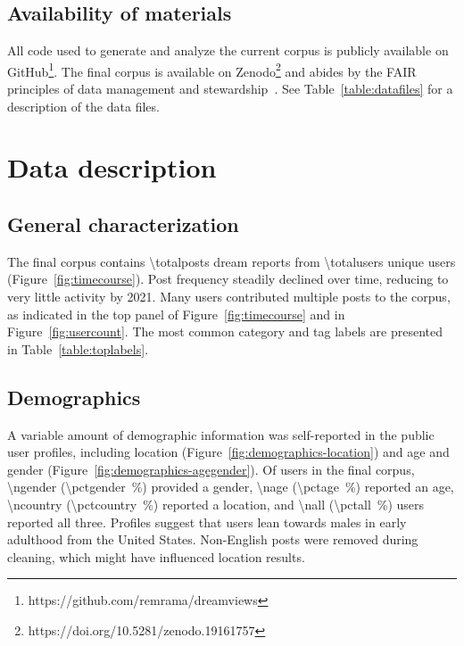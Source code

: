 \documentclass[10pt,a4paper,twocolumn]{article}
\begin{document}
\subsection{Availability of materials}\label{sec:availability}

All code used to generate and analyze the current corpus is publicly available on GitHub\footnote{https://github.com/remrama/dreamviews}. The final corpus is available on Zenodo\footnote{https://doi.org/10.5281/zenodo.19161757} and abides by the FAIR principles of data management and stewardship~\cite{wilkinson2016}. See Table~\ref{table:datafiles} for a description of the data files.

\section{Data description}\label{sec:description}

\subsection{General characterization}\label{sec:general-characterization}

The final corpus contains \num{\totalposts} dream reports from \num{\totalusers} unique users (Figure~\ref{fig:timecourse}). Post frequency steadily declined over time, reducing to very little activity by 2021. Many users contributed multiple posts to the corpus, as indicated in the top panel of Figure~\ref{fig:timecourse} and in Figure~\ref{fig:usercount}. The most common category and tag labels are presented in Table~\ref{table:toplabels}.

\subsection{Demographics}\label{sec:demographics}

A variable amount of demographic information was self-reported in the public user profiles, including location (Figure~\ref{fig:demographics-location}) and age and gender (Figure~\ref{fig:demographics-agegender}). Of users in the final corpus, \num{\ngender} (\qty{\pctgender}{\percent}) provided a gender, \num{\nage} (\qty{\pctage}{\percent}) reported an age, \num{\ncountry} (\qty{\pctcountry}{\percent}) reported a location, and \num{\nall} (\qty{\pctall}{\percent}) users reported all three. Profiles suggest that users lean towards males in early adulthood from the United States. Non-English posts were removed during cleaning, which might have influenced location results.
\end{document}
